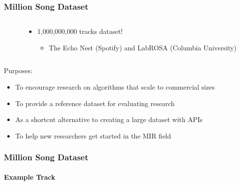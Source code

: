 \documentclass{beamer}
\begin{document}
\begin{frame}
\frametitle{Million Song Dataset}

\begin{columns}[t]
\begin{column}{.3\textwidth}
\end{column}
\begin{column}{.7\textwidth}
\begin{itemize}
  \item \alert{1,000,000,000 tracks dataset!}
  \begin{itemize}
    \item The Echo Nest (Spotify) and LabROSA (Columbia University)
    \nocite{Bertin-Mahieux2011}
   \end{itemize}
\end{itemize}
\end{column}
\end{columns}

\vspace{1cm}

Purposes:
  \begin{itemize}
    \item To encourage research on algorithms that scale to commercial sizes
    \item To provide a reference dataset for evaluating research
    \item As a shortcut alternative to creating a large dataset with APIs 
    \item To help new researchers get started in the MIR field
   \end{itemize}
\end{frame}

\begin{frame}
\frametitle{Million Song Dataset}
\framesubtitle{Example Track}
\centering
{}
\end{frame}
\end{document}
